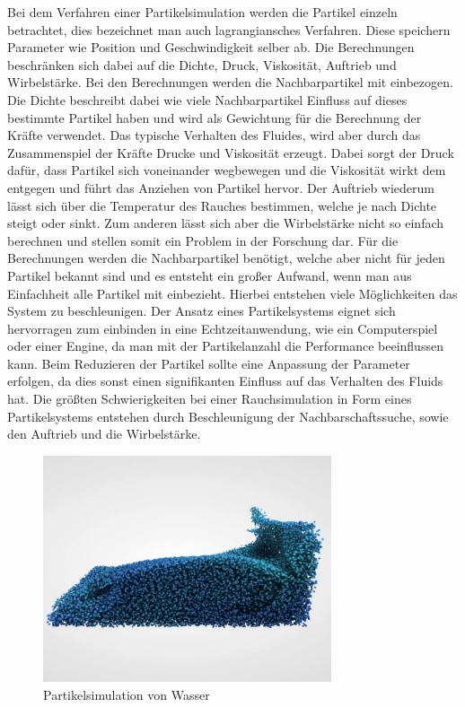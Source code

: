 \documentclass[intern,palatino]{cgBA}
\begin{document}
Bei dem Verfahren einer Partikelsimulation werden die Partikel einzeln betrachtet, dies bezeichnet man auch lagrangiansches Verfahren. Diese speichern Parameter wie Position und Geschwindigkeit selber ab. Die Berechnungen beschränken sich dabei auf die Dichte, Druck, Viskosität, Auftrieb und Wirbelstärke.
Bei den Berechnungen werden die Nachbarpartikel mit einbezogen. Die Dichte beschreibt dabei wie viele Nachbarpartikel Einfluss auf dieses bestimmte Partikel haben und wird als Gewichtung für die Berechnung der Kräfte verwendet. Das typische Verhalten des Fluides, wird aber durch das Zusammenspiel der Kräfte Drucke und Viskosität erzeugt. Dabei sorgt der Druck dafür, dass Partikel sich voneinander wegbewegen und die Viskosität wirkt dem entgegen und führt das Anziehen von Partikel hervor. Der Auftrieb wiederum lässt sich über die Temperatur des Rauches bestimmen, welche je nach Dichte steigt oder sinkt. Zum anderen lässt sich aber die Wirbelstärke nicht so einfach berechnen und stellen somit ein Problem in der Forschung dar.
Für die Berechnungen werden die Nachbarpartikel benötigt, welche aber nicht für jeden Partikel bekannt sind und es entsteht ein großer Aufwand, wenn man aus Einfachheit alle Partikel mit einbezieht. Hierbei entstehen viele Möglichkeiten das System zu beschleunigen.
\newline
Der Ansatz eines Partikelsystems eignet sich hervorragen zum einbinden in eine Echtzeitanwendung, wie ein Computerspiel oder einer Engine, da man mit der Partikelanzahl  die Performance beeinflussen kann. Beim Reduzieren der Partikel sollte eine Anpassung der Parameter erfolgen, da dies sonst einen signifikanten Einfluss auf das Verhalten des Fluids hat.
\newline
Die größten Schwierigkeiten bei einer Rauchsimulation in Form eines Partikelsystems entstehen durch Beschleunigung der Nachbarschaftssuche, sowie den Auftrieb und die Wirbelstärke.
\begin{figure}[h]
	\centering
	\includegraphics[width=8.5cm]{Bilder/partikelsystem.jpg}
	\caption[Partikelsimulation von Wasser \newline \url{https://i.ytimg.com/vi/DhNt_A3k4B4/maxresdefault.jpg}]{Partikelsimulation von Wasser}
	\label{img:Partikelsystem}
\end{figure}
\end{document}

